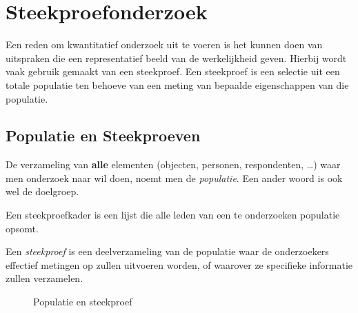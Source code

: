 \section{Steekproefonderzoek}
\label{sec:steekproefonderzoek}

Een reden om kwantitatief onderzoek uit te voeren is het kunnen doen van uitspraken die een representatief beeld van de werkelijkheid geven. Hierbij wordt vaak gebruik gemaakt van een steekproef. Een steekproef is een selectie uit een totale populatie ten behoeve van een meting van bepaalde eigenschappen van die populatie.

\subsection{Populatie en Steekproeven}

\begin{definition}[Populatie]
  De verzameling van \textbf{alle} elementen (objecten, personen, respondenten, \ldots) waar men onderzoek naar wil doen, noemt men de \emph{populatie}. Een ander woord is ook wel de doelgroep.
\end{definition}

\begin{definition}[Steekproefkader]
  Een steekproefkader is een lijst die alle leden van een te onderzoeken populatie opsomt.
\end{definition}

\begin{definition}[Steekproef]
  Een \emph{steekproef} is een deelverzameling van de populatie waar de onderzoekers effectief metingen op zullen uitvoeren worden, of waarover ze specifieke informatie zullen verzamelen.
\end{definition}

\begin{figure}
  \begin{center}
  \end{center}
  \caption{Populatie en steekproef}
  \label{img:populatie-steekproef}
\end{figure}

